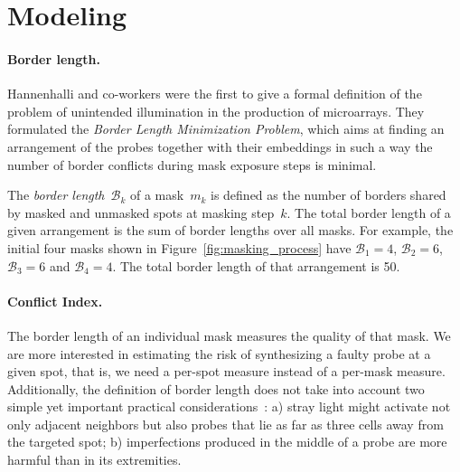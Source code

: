\documentclass[english]{lni}
\begin{document}
\section{Modeling}
\label{sec:model}

\paragraph{Border length.}
Hannenhalli and co-workers \cite{HANNENHALLI02} were the first to give a formal
definition of the problem
of unintended illumination in the production of microarrays. They formulated the
\emph{Border Length Minimization Problem}, which aims at finding an arrangement
of the probes together with their embeddings in such a way the number of border
conflicts during mask exposure steps is minimal.

The \emph{border length}~$\mathcal{B}_k$ of a mask~$m_{k}$ is
defined as the number of borders shared by masked and unmasked spots
at masking step~$k$. The total border length of a given arrangement is
the sum of border lengths over all masks. For example, the initial four
masks shown in Figure~\ref{fig:masking_process} have
$\mathcal{B}_1 = 4$, $\mathcal{B}_2 = 6$, $\mathcal{B}_3 = 6$ and
$\mathcal{B}_4 = 4$. The total border length of that arrangement is 50.

\paragraph{Conflict Index.}
The border length of an individual mask measures the quality of that
mask. We are more interested in estimating the risk of synthesizing a faulty
probe at a given spot, that is, we need a per-spot measure
instead of a per-mask measure. Additionally,
the definition of border length does not take into account two
simple yet important practical considerations~\cite{KAHNG03A}:
a) stray light might activate not only adjacent neighbors but
also probes that lie as far as three cells away from the targeted
spot;
b) imperfections produced in the middle of a probe are more
harmful than in its extremities.
\end{document}
